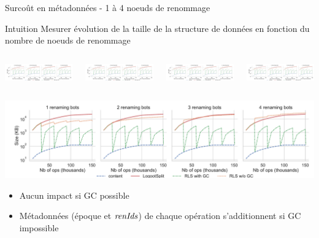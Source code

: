 \begin{frame}{Surcoût en métadonnées - 1 à 4 noeuds de renommage}
  \begin{block}{Intuition}
    Mesurer évolution de la taille de la structure de données \alert{en fonction du nombre de noeuds de renommage}
  \end{block}
  \begin{columns}
    \begin{column}{0.25\textwidth}
      \includegraphics[width=1.15\columnwidth,trim=1.6cm 0.8cm 35.8cm 0cm, clip]{img/2022-12-07-snapshot-sizes-1-4-rb.pdf}
    \end{column}
    \begin{column}{0.25\textwidth}
      \includegraphics<2->[width=\columnwidth,trim=15cm 0.8cm 24cm 0cm, clip]{img/2022-12-07-snapshot-sizes-1-4-rb.pdf}
    \end{column}
    \begin{column}{0.25\textwidth}
      \includegraphics<3->[width=\columnwidth,trim=27cm 0.8cm 12cm 0cm, clip]{img/2022-12-07-snapshot-sizes-1-4-rb.pdf}
    \end{column}
    \begin{column}{0.25\textwidth}
      \includegraphics<4->[width=\columnwidth,trim=39cm 0.8cm 0cm 0cm, clip]{img/2022-12-07-snapshot-sizes-1-4-rb.pdf}
    \end{column}
  \end{columns}
  \vspace{-1em}
  \begin{center}
    \includegraphics[width=\columnwidth,trim=2cm 0cm 2cm 12cm, clip]{img/2022-12-07-snapshot-sizes-1-4-rb.pdf}
  \end{center}
  \begin{itemize}
    \item<5> \alert{Aucun impact si GC} possible
    \item<5> \alert{Métadonnées} (époque et $\mathit{renIds}$) de chaque opération \ren \alert{s'additionnent si GC impossible}
  \end{itemize}
\end{frame}


